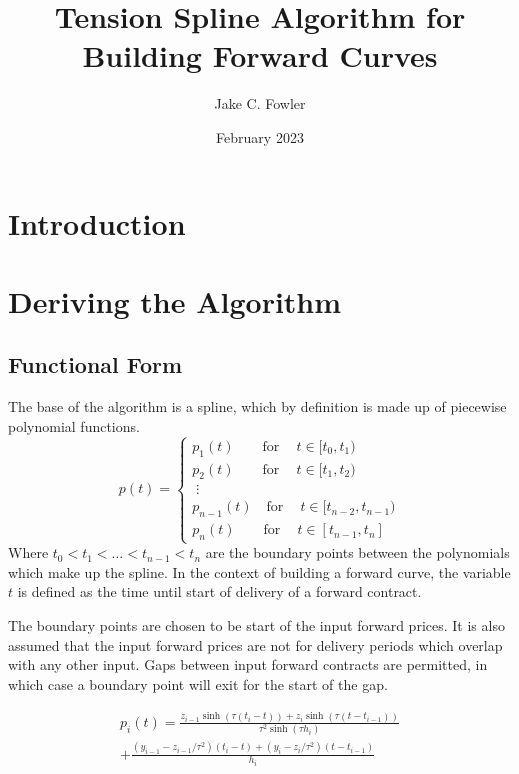 \documentclass{article}
\title{Tension Spline Algorithm for Building Forward Curves}
\author{Jake C. Fowler}
\date{February 2023}
\begin{document}
\newcommand{\+}[1]{\ensuremath{\mathbf{#1}}}

\maketitle

\section{Introduction}

\section{Deriving the Algorithm}
\subsection{Functional Form}
The base of the algorithm is a spline, which by definition is made up of piecewise polynomial functions.
\begin{equation}
p(t) = 
\begin{cases}
    p_1(t)\qquad \text{for}\ \quad t \in [t_0, t_1) \\
    p_2(t)\qquad \text{for}\ \quad t \in [t_1, t_2) \\
    \;\vdots \\
    p_{n-1}(t)\quad \text{for}\ \quad t \in [t_{n-2}, t_{n-1}) \\
    p_n(t)\qquad \text{for}\ \quad t \in [t_{n-1}, t_n]
\end{cases}
\end{equation}
Where $t_0 < t_1 < \hdots < t_{n-1} < t_{n}$ are the boundary points between the polynomials which make up the spline.
In the context of building a forward curve, the variable $t$ is defined as
the time until start of delivery of a forward contract.

\bigskip

The boundary points are chosen to be start of the input forward prices. It is also
assumed that the input forward prices are not for delivery periods which overlap
with any other input. Gaps between input forward contracts are permitted, in which
case a boundary point will exit for the start of the gap.

\bigskip

\begin{multline}
p_i(t) = \frac{z_{i-1} \sinh(\tau (t_i - t)) + z_i \sinh(\tau (t - t_{i-1}))}{\tau^2 \sinh(\tau h_i)}  \\
    + \frac{(y_{i-1} - z_{i-1}/\tau^2)(t_i - t) + (y_i - z_i/\tau^2)(t - t_{i-1})}{h_i}
\end{multline}
\end{document}
